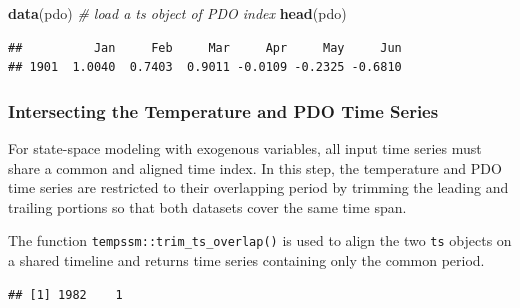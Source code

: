 \documentclass[
]{article}
\newenvironment{Shaded}{\begin{snugshade}}{\end{snugshade}}
\newcommand{\AttributeTok}[1]{\textcolor[rgb]{0.13,0.29,0.53}{#1}}
\newcommand{\CommentTok}[1]{\textcolor[rgb]{0.56,0.35,0.01}{\textit{#1}}}
\newcommand{\FunctionTok}[1]{\textcolor[rgb]{0.13,0.29,0.53}{\textbf{#1}}}
\newcommand{\NormalTok}[1]{#1}
\newcommand{\OtherTok}[1]{\textcolor[rgb]{0.56,0.35,0.01}{#1}}
\newcommand{\SpecialCharTok}[1]{\textcolor[rgb]{0.81,0.36,0.00}{\textbf{#1}}}
\newcommand{\StringTok}[1]{\textcolor[rgb]{0.31,0.60,0.02}{#1}}
\begin{document}
\begin{Shaded}
\begin{Highlighting}[]
\FunctionTok{data}\NormalTok{(pdo) }\CommentTok{\# load a ts object of PDO index}
\FunctionTok{head}\NormalTok{(pdo)}
\end{Highlighting}
\end{Shaded}

\begin{verbatim}
##          Jan     Feb     Mar     Apr     May     Jun
## 1901  1.0040  0.7403  0.9011 -0.0109 -0.2325 -0.6810
\end{verbatim}

\subsubsection{Intersecting the Temperature and PDO Time
Series}\label{intersecting-the-temperature-and-pdo-time-series}

For state-space modeling with exogenous variables, all input time series
must share a common and aligned time index. In this step, the
temperature and PDO time series are restricted to their overlapping
period by trimming the leading and trailing portions so that both
datasets cover the same time span.

The function \texttt{tempssm::trim\_ts\_overlap()} is used to align the
two \texttt{ts} objects on a shared timeline and returns time series
containing only the common period.

\begin{Shaded}
\end{Shaded}

\begin{verbatim}
## [1] 1982    1
\end{verbatim}
\end{document}
